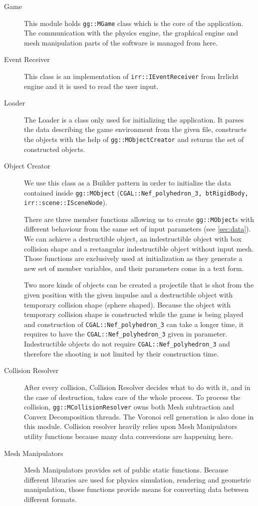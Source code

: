 \begin{description}
\item[Game]
This module holds {\tt gg::MGame} class which is the core of the application. The communication with the physics engine,  the graphical engine and mesh manipulation parts of the software is managed from here.

\item[Event Receiver]
This class is an implementation of {\tt irr::IEventReceiver} from Irrlicht engine and it is used to read the user input.

\item[Loader]
The Loader is a class only used for initializing the application. It parses the data describing the game environment from the given file, constructs the objects with the help of {\tt gg::MObjectCreator} and returns the set of constructed objects.

\item[Object Creator]
We use this class as a Builder pattern in order to initialize the data contained inside {\tt gg::MObject} ({\tt CGAL::Nef\_polyhedron\_3, btRigidBody, irr::scene::ISceneNode}).

There are three member functions allowing us to create {\tt gg::MObject}s  with different behaviour from the same set of input parameters (see \cref{sec:data}). We can achieve a destructible object, an indestructible object with box collision shape and a rectangular indestructible object without input mesh. Those functions are exclusively used at initialization as they generate a new set of member variables, and their parameters come in a text form.

Two more kinds of objects can be created a projectile that is shot from the given position with the given impulse and a destructible object with temporary collision shape (sphere shaped). Because the object with temporary collision shape is constructed while the game is being played and construction of {\tt CGAL::Nef\_polyhedron\_3} can take a longer time, it requires to have the {\tt CGAL::Nef\_polyhedron\_3} given in parameter. Indestructible objects do not require {\tt CGAL::Nef\_polyhedron\_3}  and therefore the shooting is not limited by their construction time.

\item[Collision Resolver]
After every collision, Collision Resolver decides what to do with it, and in the case of destruction, takes care of the whole process. To process the collision, {\tt gg::MCollisionResolver} owns both Mesh subtraction and Convex Decomposition threads. The Voronoi cell generation is also done in this module. Collision resolver heavily relies upon Mesh Manipulators utility functions because many data conversions are happening here.

\item[Mesh Manipulators]
Mesh Manipulators provides set of public static functions. Because different libraries are used for physics simulation, rendering and geometric manipulation, those functions provide means for converting data between different formats.
\end{description}





